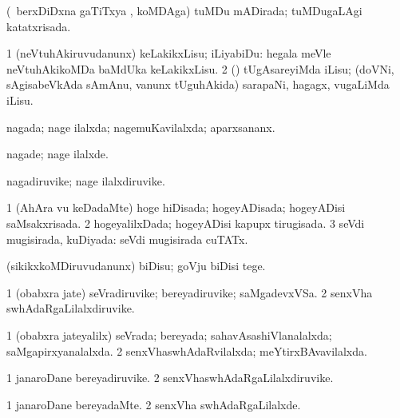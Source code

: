 \bentry
{} 
\gl{\gu}
\expl{}
\bmng
(\kanmu\ berxDiDxna gaTiTxya \vi, koMDAga) tuMDu mADirada; tuMDugaLAgi katatxrisada. 
\emng
\eentry

\bentry
{} 
\gl{\akirx}
\bmng
\bnum
\num{1} (neVtuhAkiruvudanunx) keLakikxLisu; iLiyabiDu:  hegala meVle neVtuhAkikoMDa baMdUka keLakikxLisu. 
\num{2} (\nw) tUgAsareyiMda iLisu; (doVNi, sAgisabeVkAda sAmAnu, \mo vanunx tUguhAkida) sarapaNi, hagagx, \mo vugaLiMda iLisu. 
\enum
\emng
\eentry

\bentry
{} 
\gl{\gu}
\expl{}
\bmng
nagada; nage ilalxda; nagemuKavilalxda; aparxsananx. 
\emng
\eentry

\bentry
{} 
\gl{\kirxvi}
\expl{}
\bmng
nagade; nage ilalxde. 
\emng
\eentry

\bentry
{} 
\gl{\nA}
\expl{}
\bmng
nagadiruvike; nage ilalxdiruvike. 
\emng
\eentry

\bentry
{} 
\gl{\gu}
\expl{}
\bmng
\bnum
\num{1} (AhAra \mo vu keDadaMte) hoge hiDisada; hogeyADisada; hogeyADisi saMsakxrisada. 
\num{2} hogeyalilxDada; hogeyADisi kapupx tirugisada. 
\num{3} seVdi mugisirada, kuDiyada:  seVdi mugisirada cuTATx. 
\enum
\emng
\eentry

\bentry
{} 
\gl{\sakirx}
\expl{}
\bmng
(sikikxkoMDiruvudanunx) biDisu; goVju biDisi tege. 
\emng
\eentry

\bentry
{} 
\gl{\nA}
\expl{}
\bmng
\bnum
\num{1} (obabxra jate) seVradiruvike; bereyadiruvike; saMgadevxVSa. 
\num{2} senxVha swhAdaRgaLilalxdiruvike. 
\enum
\emng
\eentry

\bentry
{} 
\gl{\gu}
\expl{}
\bmng
\bnum
\num{1} (obabxra jateyalilx) seVrada; bereyada; sahavAsashiVlanalalxda; saMgapirxyanalalxda. 
\num{2} senxVhaswhAdaRvilalxda; meYtirxBAvavilalxda. 
\enum
\emng
\eentry

\bentry
{} 
\gl{\nA}
\expl{}
\bmng
\bnum
\num{1} janaroDane bereyadiruvike. 
\num{2} senxVhaswhAdaRgaLilalxdiruvike. 
\enum
\emng
\eentry

\bentry
{} 
\gl{\kirxvi}
\expl{}
\bmng
\bnum
\num{1} janaroDane bereyadaMte. 
\num{2} senxVha swhAdaRgaLilalxde. 
\enum
\emng
\eentry

